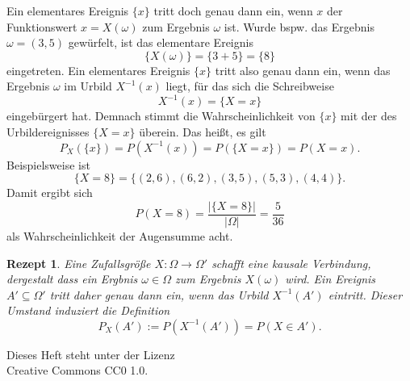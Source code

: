 \documentclass[a4paper,10pt,fleqn,twocolumn,twoside,dvipdfmx]{scrartcl}
\theoremstyle{rmbox}
\newtheorem{Rezept}{Rezept}[section]
\begin{document}
Ein elementares Ereignis $\{x\}$ tritt doch genau dann ein,
wenn $x$ der Funktionswert $x=X(\omega)$ zum Ergebnis
$\omega$ ist. Wurde bspw. das Ergebnis $\omega=(3, 5)$
gewürfelt, ist das elementare Ereignis%
\[\{X(\omega)\} = \{3 + 5\} = \{8\}\]
eingetreten.
Ein elementares Ereignis $\{x\}$ tritt also genau dann ein, wenn das
Ergebnis $\omega$ im Urbild $X^{-1}(x)$ liegt, für das sich die
Schreibweise%
\[X^{-1}(x)=\{X=x\}\]
eingebürgert hat. Demnach stimmt die Wahrscheinlichkeit von $\{x\}$
mit der des Urbildereignisses $\{X=x\}$ überein. Das heißt, es gilt%
\[P_X(\{x\}) = P(X^{-1}(x)) = P(\{X=x\}) = P(X=x).\]
Beispielsweise ist
\[\{X=8\} = \{(2,6), (6,2), (3,5), (5,3), (4,4)\}.\]
Damit ergibt sich
\[P(X=8) = \frac{|\{X=8\}|}{|\Omega|} = \frac{5}{36}\]
als Wahrscheinlichkeit der Augensumme acht.

\begin{Rezept}
Eine Zufallsgröße $X\colon\Omega\to\Omega'$ schafft eine kausale
Verbindung, dergestalt dass ein Ergbnis $\omega\in\Omega$ zum
Ergebnis $X(\omega)$ wird. Ein Ereignis $A'\subseteq\Omega'$
tritt daher genau dann ein, wenn das Urbild $X^{-1}(A')$ eintritt.
Dieser Umstand induziert die Definition
\[P_X(A') := P(X^{-1}(A')) = P(X\in A').\]
\end{Rezept}

\vfill\noindent
Dieses Heft steht unter der Lizenz\\
Creative Commons CC0 1.0.
\end{document}

